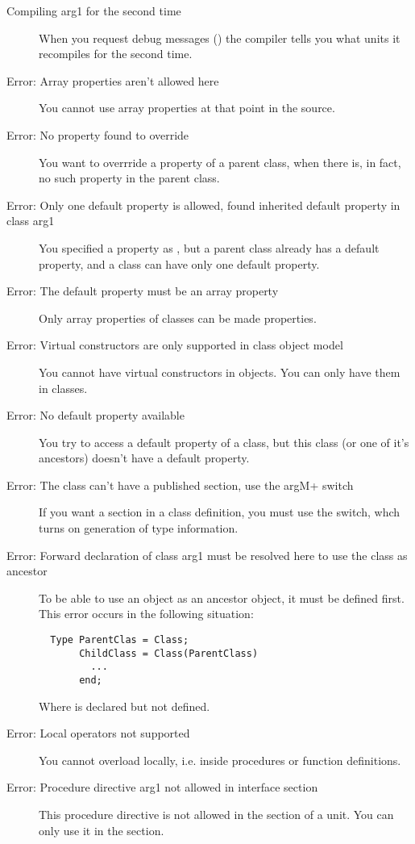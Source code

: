 \begin{description}
\item [Compiling arg1 for the second time]
 When you request debug messages () the compiler tells you what
 units it recompiles for the second time.
\item [Error: Array properties aren't allowed here]
 You cannot use array properties at that point in the source.
\item [Error: No property found to override]
 You want to overrride a property of a parent class, when there is, in fact,
 no such property in the parent class.
\item [Error: Only one default property is allowed, found inherited default property in class arg1]
 You specified a property as , but a parent class already has a
 default property, and a class can have only one default property.
\item [Error: The default property must be an array property]
 Only array properties of classes can be made  properties.
\item [Error: Virtual constructors are only supported in class object model]
 You cannot have virtual constructors in objects. You can only have them
 in classes.
\item [Error: No default property available]
 You try to access a default property of a class, but this class (or one of
 it's ancestors) doesn't have a default property.
\item [Error: The class can't have a published section, use the {argM+} switch]
 If you want a  section in a class definition, you must
 use the  switch, whch turns on generation of type
 information.
\item [Error: Forward declaration of class arg1 must be resolved here to use the class as ancestor]
 To be able to use an object as an ancestor object, it must be defined
 first. This error occurs in the following situation:
 \begin{verbatim}
  Type ParentClas = Class;
       ChildClass = Class(ParentClass)
         ...
       end;
 \end{verbatim}
 Where  is declared but not defined.
\item [Error: Local operators not supported]
 You cannot overload locally, i.e. inside procedures or function
 definitions.
\item [Error: Procedure directive arg1 not allowed in interface section]
 This procedure directive is not allowed in the  section of
 a unit. You can only use it in the  section.

\end{description}
